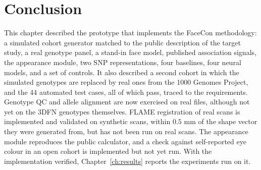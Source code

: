 \section{Conclusion}
This chapter described the prototype that implements the FaceCon methodology: a simulated cohort generator matched to the public description of the target study, a real genotype panel, a stand-in face model, published association signals, the appearance module, two SNP representations, four baselines, four neural models, and a set of controls. It also described a second cohort in which the simulated genotypes are replaced by real ones from the 1000 Genomes Project, and the 44 automated test cases, all of which pass, traced to the requirements. Genotype QC and allele alignment are now exercised on real files, although not yet on the 3DFN genotypes themselves. FLAME registration of real scans is implemented and validated on synthetic scans, within $0.5$ mm of the shape vector they were generated from, but has not been run on real scans. The appearance module reproduces the public calculator, and a check against self-reported eye colour in an open cohort is implemented but not yet run. With the implementation verified, Chapter~\ref{ch:results} reports the experiments run on it.
